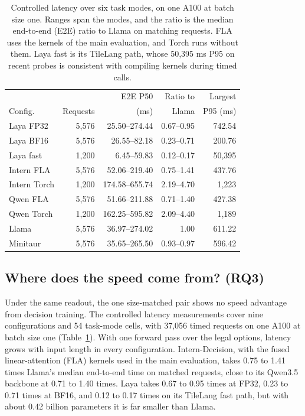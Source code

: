 \documentclass[11pt,a4paper]{article}
\begin{document}
\begin{table}[!b]
\centering\footnotesize
\setlength{\tabcolsep}{2pt}
\begin{tabular}{@{}lrrrr@{}}
\toprule
 & & E2E P50 & Ratio to & Largest \\
Config. & Requests & (ms) & Llama & P95 (ms) \\
\midrule
Laya FP32 & 5,576 & 25.50--274.44 & 0.67--0.95 & 742.54 \\
Laya BF16 & 5,576 & 26.55--82.18 & 0.23--0.71 & 200.76 \\
Laya fast & 1,200 & 6.45--59.83 & 0.12--0.17 & 50,395 \\
Intern FLA & 5,576 & 52.06--219.40 & 0.75--1.41 & 437.76 \\
Intern Torch & 1,200 & 174.58--655.74 & 2.19--4.70 & 1,223 \\
Qwen FLA & 5,576 & 51.66--211.88 & 0.71--1.40 & 427.38 \\
Qwen Torch & 1,200 & 162.25--595.82 & 2.09--4.40 & 1,189 \\
\rowcolor{tablegray} Llama & 5,576 & 36.97--274.02 & 1.00 & 611.22 \\
Minitaur & 5,576 & 35.65--265.50 & 0.93--0.97 & 596.42 \\
\bottomrule
\end{tabular}
\caption{Controlled latency over six task modes, on one A100 at batch size one. Ranges span the modes, and the ratio is the median end-to-end (E2E) ratio to Llama on matching requests. FLA uses the kernels of the main evaluation, and Torch runs without them. Laya fast is its TileLang path, whose 50,395 ms P95 on recent probes is consistent with compiling kernels during timed calls.}
\label{tab:p1-latency-summary}
\end{table}


\subsection{Where does the speed come from? (RQ3)}
\label{sec:rq3}
Under the same readout, the one size-matched pair shows no speed advantage from decision training. The controlled latency measurements cover nine configurations and 54 task-mode cells, with 37,056 timed requests on one A100 at batch size one (Table~\ref{tab:p1-latency-summary}). With one forward pass over the legal options, latency grows with input length in every configuration. Intern-Decision, with the fused linear-attention (FLA) kernels used in the main evaluation, takes 0.75 to 1.41 times Llama's median end-to-end time on matched requests, close to its Qwen3.5 backbone at 0.71 to 1.40 times. Laya takes 0.67 to 0.95 times at FP32, 0.23 to 0.71 times at BF16, and 0.12 to 0.17 times on its TileLang fast path, but with about 0.42 billion parameters it is far smaller than Llama.
\end{document}
